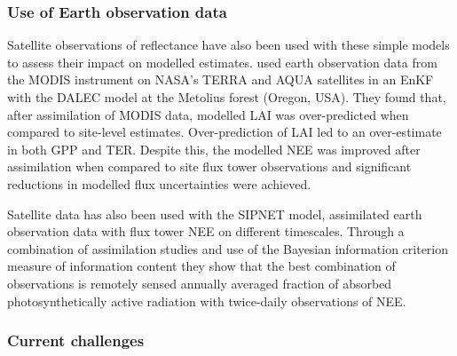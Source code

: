 \subsubsection{Use of Earth observation data}

Satellite observations of reflectance have also been used with these simple models to assess their impact on modelled estimates. \citet{Quaife2008} used earth observation data from the MODIS instrument on NASA's TERRA and AQUA satellites in an EnKF with the DALEC model at the Metolius forest (Oregon, USA). They found that, after assimilation of MODIS data, modelled LAI was over-predicted when compared to site-level estimates. Over-prediction of LAI led to an over-estimate in both GPP and TER. Despite this, the modelled NEE was improved after assimilation when compared to site flux tower observations and significant reductions in modelled flux uncertainties were achieved. 

Satellite data has also been used with the SIPNET model, \citet{zobitz2014joint} assimilated earth observation data with flux tower NEE on different timescales. Through a combination of assimilation studies and use of the Bayesian information criterion \citep{schwarz1978estimating} measure of information content they show that the best combination of observations is remotely sensed annually averaged fraction of absorbed photosynthetically active radiation with twice-daily observations of NEE. 

\subsubsection{Current challenges}    

